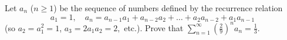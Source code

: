 Let $a_n$ ($n \ge 1$) be the sequence of numbers defined by the recurrence relation
$$ a_1 = 1, \quad a_n = a_{n-1} a_1 + a_{n-2} a_2 + \dots + a_2 a_{n-2} + a_1 a_{n-1} $$
(so $a_2 = a_1^2 = 1$, $a_3 = 2a_1 a_2 = 2,$ etc.). Prove that
$\displaystyle{\sum_{n=1}^{\infty} \left(\frac{2}{9}\right)^n a_n = \frac{1}{3}}$.
